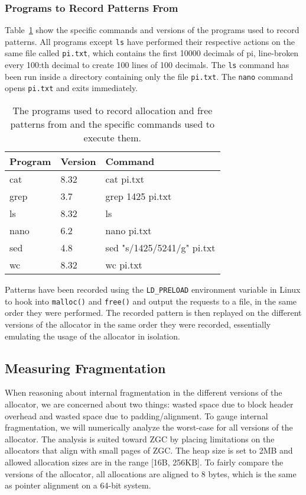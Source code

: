 \subsubsection{Programs to Record Patterns From}

Table~\ref{table:pattern-programs} show the specific commands and versions of the programs used to record patterns. All programs except \texttt{ls} have performed their respective actions on the same file called \texttt{pi.txt}, which contains the first 10000 decimals of pi, line-broken every 100:th decimal to create 100 lines of 100 decimals. The \texttt{ls} command has been run inside a directory containing only the file \texttt{pi.txt}. The \texttt{nano} command opens \texttt{pi.txt} and exits immediately.

\begin{table}[H]
\centering
\begin{tabular}{llp{10.4cm}}
\textbf{Program} & \textbf{Version} & \textbf{Command} \\ \hline
cat  & 8.32 & cat pi.txt\\ \hline
grep & 3.7  & grep 1425 pi.txt\\ \hline
ls   & 8.32 & ls \\ \hline
nano & 6.2  & nano pi.txt\\ \hline
sed  & 4.8  & sed "s/1425/5241/g" pi.txt\\ \hline
wc   & 8.32 & wc pi.txt\\
\end{tabular}
\caption{The programs used to record allocation and free patterns from and the specific commands used to execute them.}
\label{table:pattern-programs}
\end{table}

Patterns have been recorded using the \texttt{LD\_PRELOAD} environment variable in Linux to hook into \texttt{malloc()} and \texttt{free()} and output the requests to a file, in the same order they were performed. The recorded pattern is then replayed on the different versions of the allocator in the same order they were recorded, essentially emulating the usage of the allocator in isolation.

\subsection{Measuring Fragmentation}

When reasoning about internal fragmentation in the different versions of the allocator, we are concerned about two things: wasted space due to block header overhead and wasted space due to padding/alignment. To gauge internal fragmentation, we will numerically analyze the worst-case for all versions of the allocator. The analysis is suited toward ZGC by placing limitations on the allocators that align with small pages of ZGC. The heap size is set to 2MB and allowed allocation sizes are in the range [16B, 256KB]. To fairly compare the versions of the allocator, all allocations are aligned to 8 bytes, which is the same as pointer alignment on a 64-bit system.

